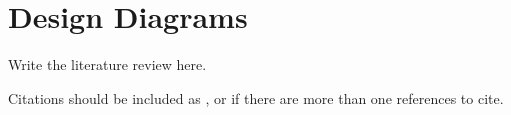 \chapter{Design Diagrams}\label{chapter:Design Diagrams}
\indent Write the literature review here.

\indent Citations should be included as \cite{Chen}, or \cite{Kondoz,atal} if there are more than one references to cite.

\indent 
